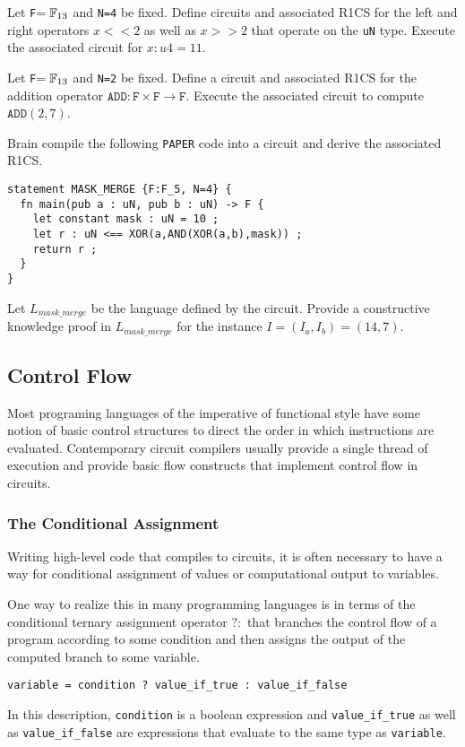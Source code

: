 \begin{exercise}
Let \texttt{F}$=\mathbb{F}_{13}$ and \texttt{N=4} be fixed. Define circuits and associated R1CS for the left and right  operators $x<<2$ as well as $x>>2$ that operate on the \texttt{uN} type. Execute the associated circuit for $x:u4 = 11$.
\end{exercise}
\begin{exercise}
Let \texttt{F}$=\mathbb{F}_{13}$ and \texttt{N=2} be fixed. Define a circuit and associated R1CS for the addition operator $\mathtt{ADD}: \mathtt{F} \times \mathtt{F} \to \mathtt{F}$. Execute the associated circuit to compute $\mathtt{ADD}(2,7)$.
\end{exercise}
\begin{exercise} Brain compile the following \texttt{PAPER} code into a circuit and derive the associated R1CS. 
\begin{lstlisting}
statement MASK_MERGE {F:F_5, N=4} {
  fn main(pub a : uN, pub b : uN) -> F {
    let constant mask : uN = 10 ;
    let r : uN <== XOR(a,AND(XOR(a,b),mask)) ;
    return r ;
  }
}
\end{lstlisting}
Let $L_{mask\_merge}$ be the language defined by the circuit. Provide a constructive knowledge proof in $L_{mask\_merge}$ for the instance $I=(I_a, I_b) = (14, 7)$.
\end{exercise}
\subsection{Control Flow} Most programing languages of the imperative of functional style have some notion of basic control structures to direct the order in which instructions are evaluated. Contemporary circuit compilers usually provide a single thread of execution and provide basic flow constructs that implement control flow in circuits.
\subsubsection{The Conditional Assignment} Writing high-level code that compiles to circuits, it is often necessary to have a way for conditional assignment of values or computational output to variables.

One way to realize this in many programming languages is in terms of the conditional ternary assignment operator $?:$ that branches the control flow of a program according to some condition and then assigns the output of the computed branch to some variable. 
\begin{lstlisting}
variable = condition ? value_if_true : value_if_false  
\end{lstlisting}
In this description, \texttt{condition} is a boolean expression and \texttt{value\_if\_true} as well as \texttt{value\_if\_false} are expressions that evaluate to the same type as \texttt{variable}.

